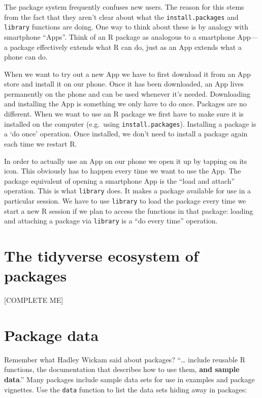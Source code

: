 \documentclass[
]{book}
\begin{document}
The package system frequently confuses new users. The reason for this stems from the fact that they aren't clear about what the \texttt{install.packages} and \texttt{library} functions are doing. One way to think about these is by analogy with smartphone ``Apps''. Think of an R package as analogous to a smartphone App--- a package effectively extends what R can do, just as an App extends what a phone can do.

When we want to try out a new App we have to first download it from an App store and install it on our phone. Once it has been downloaded, an App lives permanently on the phone and can be used whenever it's needed. Downloading and installing the App is something we only have to do once. Packages are no different. When we want to use an R package we first have to make sure it is installed on the computer (e.g.~using \texttt{install.packages}). Installing a package is a `do once' operation. Once installed, we don't need to install a package again each time we restart R.

In order to actually use an App on our phone we open it up by tapping on its icon. This obviously has to happen every time we want to use the App. The package equivalent of opening a smartphone App is the ``load and attach'' operation. This is what \texttt{library} does. It makes a package available for use in a particular session. We have to use \texttt{library} to load the package every time we start a new R session if we plan to access the functions in that package: loading and attaching a package via \texttt{library} is a ``do every time'' operation.

\hypertarget{the-tidyverse-ecosystem-of-packages}{%
\section{The tidyverse ecosystem of packages}\label{the-tidyverse-ecosystem-of-packages}}

{[}COMPLETE ME{]}

\hypertarget{package-data}{%
\section{Package data}\label{package-data}}

Remember what Hadley Wickam said about packages? ``\ldots{} include reusable R functions, the documentation that describes how to use them, \textbf{and sample data}.'' Many packages include sample data sets for use in examples and package vignettes. Use the \texttt{data} function to list the data sets hiding away in packages:
\end{document}
